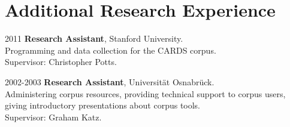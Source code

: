 %
\section*{Additional Research Experience}
\begin{dated}
	\item[2011]
		\textbf{Research Assistant}, Stanford University.\\
	    Programming and data collection for the CARDS corpus.\\
	    Supervisor: Christopher Potts.
	\item[2002-2003]
		\textbf{Research Assistant},  Universität Osnabrück.\\
	    Administering corpus resources, providing technical support to corpus 
	    users, giving introductory presentations about corpus tools.\\
	    Supervisor: Graham Katz.
\end{dated}